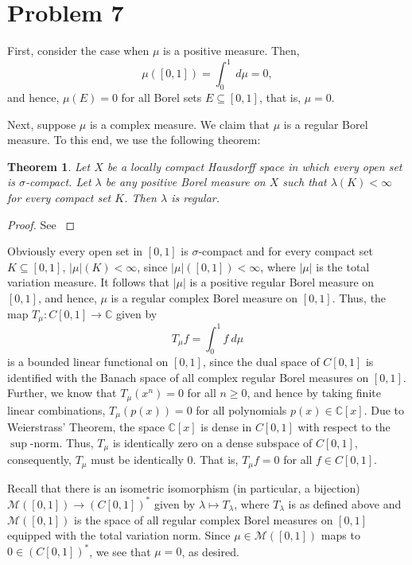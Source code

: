 \documentclass[10pt]{amsart}
\theoremstyle{thmstyle}
\newtheorem{theorem}{Theorem}[section]
\theoremstyle{defstyle}
\newcommand{\bbC}{\mathbb{C}}
\renewcommand{\ge}{\geqslant}
\begin{document}
\section{Problem 7}

First, consider the case when $\mu$ is a positive measure. Then, 
\begin{equation*}
	\mu\left([0, 1]\right) = \int_0^1 ~d\mu = 0,
\end{equation*}
and hence, $\mu(E) = 0$ for all Borel sets $E\subseteq[0, 1]$, that is, $\mu = 0$.

Next, suppose $\mu$ is a complex measure. We claim that $\mu$ is a regular Borel measure. To this end, we use the following theorem: 

\begin{theorem}
	Let $X$ be a locally compact Hausdorff space in which every open set is $\sigma$-compact. Let $\lambda$ be any positive Borel measure on $X$ such that $\lambda(K) < \infty$ for every compact set $K$. Then $\lambda$ is regular.
\end{theorem}
\begin{proof}
	See \cite[Theorem 2.17]{papa-rudin}
\end{proof}

Obviously every open set in $[0, 1]$ is $\sigma$-compact and for every compact set $K\subseteq[0, 1]$, $|\mu|(K) < \infty$, since $|\mu|([0, 1]) < \infty$, where $|\mu|$ is the total variation measure. It follows that $|\mu|$ is a positive regular Borel measure on $[0, 1]$, and hence, $\mu$ is a regular complex Borel measure on $[0, 1]$. Thus, the map $T_\mu: C[0, 1]\to\bbC$ given by 
\begin{equation*}
	T_\mu f = \int_0^1 f~d\mu
\end{equation*}
is a bounded linear functional on $[0, 1]$, since the dual space of $C[0, 1]$ is identified with the Banach space of all complex regular Borel measures on $[0, 1]$. Further, we know that $T_\mu(x^n) = 0$ for all $n\ge 0$, and hence by taking finite linear combinations, $T_\mu(p(x)) = 0$ for all polynomials $p(x)\in\bbC[x]$. Due to Weierstrass' Theorem, the space $\bbC[x]$ is dense in $C[0, 1]$ with respect to the $\sup$-norm. Thus, $T_\mu$ is identically zero on a dense subspace of $C[0, 1]$, consequently, $T_\mu$ must be identically $0$. That is, $T_\mu f = 0$ for all $f\in C[0, 1]$.

Recall that there is an isometric isomorphism (in particular, a bijection) $\mathscr M([0, 1])\to \left(C[0, 1]\right)^\ast$ given by $\lambda\mapsto T_\lambda$, where $T_\lambda$ is as defined above and $\mathscr M([0, 1])$ is the space of all regular complex Borel measures on $[0, 1]$ equipped with the total variation norm. Since $\mu\in\mathscr M([0, 1])$ maps to $0\in\left(C[0, 1]\right)^\ast$, we see that $\mu = 0$, as desired.
\end{document}
